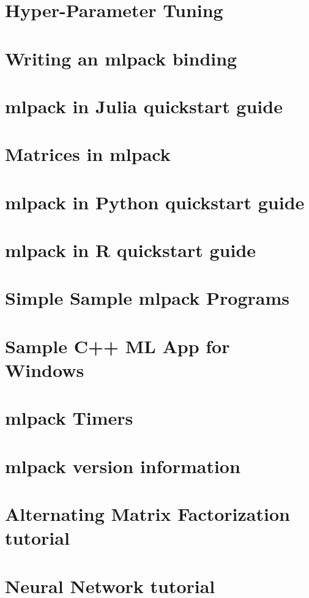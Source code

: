 \let\mypdfximage\pdfximage\def\pdfximage{\immediate\mypdfximage}\documentclass[twoside]{book}
\newcommand{\+}{\discretionary{\mbox{\scriptsize$\hookleftarrow$}}{}{}}
\begin{document}
\chapter{Hyper-\/\+Parameter Tuning}
\label{hpt_guide}

\chapter{Writing an mlpack binding}
\label{iodoc}

\chapter{mlpack in Julia quickstart guide}
\label{julia_quickstart}

\chapter{Matrices in mlpack}
\label{matrices}

\chapter{mlpack in Python quickstart guide}
\label{python_quickstart}

\chapter{mlpack in R quickstart guide}
\label{r_quickstart}

\chapter{Simple Sample mlpack Programs}
\label{sample}

\chapter{Sample C++ ML App for Windows}
\label{sample_ml_app}

\chapter{mlpack Timers}
\label{timer}

\chapter{mlpack version information}
\label{verinfo}

\chapter{Alternating Matrix Factorization tutorial}
\label{amftutorial}

\chapter{Neural Network tutorial}
\label{anntutorial}

\end{document}
